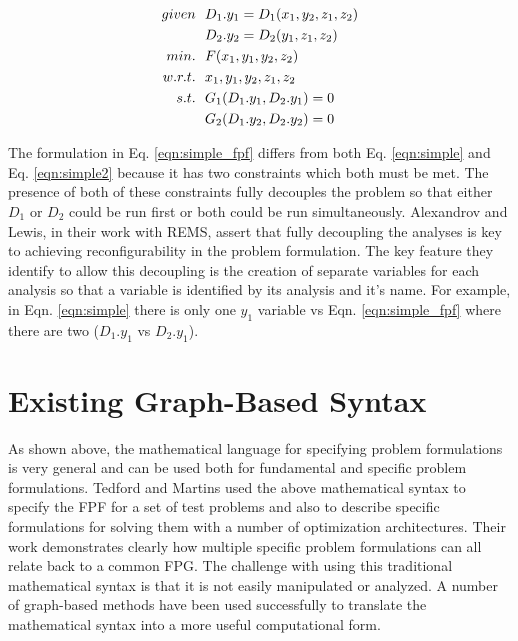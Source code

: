     \begin{align}
        given & \ \ D_1.y_1 = D_1(x_1,y_2,z_1,z_2) \notag
        \\      & \ \ D_2.y_2 = D_2(y_1,z_1,z_2) \notag
        \\min. &\ \ F(x_1,y_1,y_2,z_2) \notag
        \\w.r.t. & \ \ x_1,y_1,y_2,z_1,z_2 \notag
        \\s.t. & \ \ G_1(D_1.y_1,D_2.y_1) = 0 \notag
        \\     & \ \ G_2(D_1.y_2,D_2.y_2) = 0
        \label{eqn:simple_fpf}
    \end{align}

    The formulation in Eq. \ref{eqn:simple_fpf} differs from both Eq. \ref{eqn:simple} 
    and Eq. \ref{eqn:simple2} because it has two constraints which both must be 
    met. The presence of both of these constraints fully decouples the problem so that 
    either $D_1$ or $D_2$ could be run first or both could be run simultaneously. 
    Alexandrov and Lewis, in their work with REMS, assert that fully decoupling 
    the analyses is key to achieving reconfigurability in the problem 
    formulation\cite{alexandrov2004}. The key feature they identify to allow this decoupling 
    is the creation of separate variables for each analysis so that a variable 
    is identified by its analysis and it's name. For example, in Eqn. \ref{eqn:simple}
    there is only one $y_1$ variable vs Eqn. \ref{eqn:simple_fpf} where 
    there are two ($D_1.y_1$ vs $D_2.y_1$). 


\section{Existing Graph-Based Syntax}
	\label{s:existing syntax}
    As shown above, the mathematical language for specifying problem formulations is very general and can be used both for 
    fundamental and specific problem formulations. Tedford and Martins used the above mathematical syntax to specify the 
    FPF for a set of test problems and also to describe specific formulations for solving them with a 
    number of optimization architectures\cite{Tedford2009}. Their work demonstrates clearly how multiple specific 
    problem formulations can all relate back to a common FPG. The challenge with using this 
    traditional mathematical syntax is that it is not easily manipulated or analyzed. 
    A number of graph-based methods have been used successfully to translate the 
    mathematical syntax into a more useful computational form. 
    
